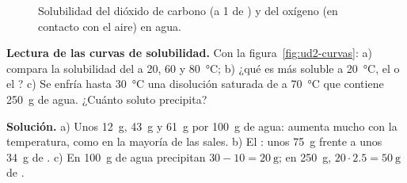 \begin{figure}[H]
    \centering
    \hfill
    \caption{Solubilidad del dióxido de carbono (a \qty{1}{\atm} de ) y del oxígeno (en contacto con el aire) en agua.}
    \label{fig:ud2-gases}
\end{figure}

\begin{example}
    \textbf{Lectura de las curvas de solubilidad.} Con la figura~\ref{fig:ud2-curvas}: a) compara la solubilidad del
     a 20, 60 y \qty{80}{\degreeCelsius}; b) ¿qué es más soluble a \qty{20}{\degreeCelsius}, el  o el
    ? c) Se enfría hasta \qty{30}{\degreeCelsius} una disolución saturada de  a \qty{70}{\degreeCelsius} que
    contiene \qty{250}{\gram} de agua. ¿Cuánto soluto precipita?

    \textbf{Solución.} a) Unos \qty{12}{\gram}, \qty{43}{\gram} y \qty{61}{\gram} por \qty{100}{\gram} de agua: aumenta mucho
    con la temperatura, como en la mayoría de las sales. b) El : unos \qty{75}{\gram} frente a unos \qty{34}{\gram} de
    . c) En \qty{100}{\gram} de agua precipitan \(30 - 10 = \qty{20}{\gram}\); en \qty{250}{\gram},
    \(20 \cdot \num{2.5} = \qty{50}{\gram}\) de .
\end{example}

